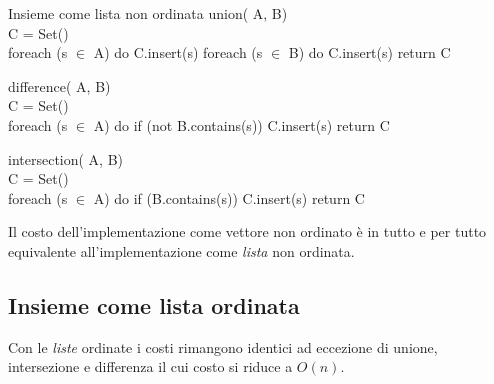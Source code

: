 \begin{minicode}{Insieme come lista non ordinata}
\ind{} union( A,  B)\\
     C = Set()\\
    \indf foreach (s $\in$ A) do\hfill{}
        C.insert(s)\hfill{}
    \indf foreach (s $\in$ B) do\hfill{}
        C.insert(s)\hfill{}
    \indf return C\hfill{}

\ind{} difference( A,  B)\\
     C = Set()\\
    \indf foreach (s $\in$ A) do\hfill{}
        \indff if (not B.contains(s))\hfill{}
            C.insert(s)\hfill{}
    \indf return C\hfill{}
\end{minicode}
\begin{codecont}
\ind{} intersection( A,  B)\\
     C = Set()\\
    \ind foreach (s $\in$ A) do\hfill{}
        \indf if (B.contains(s))\hfill{}
            \indff C.insert(s)\hfill{}
    \indent return C\hfill{}
\end{codecont}

\begin{note}
    Il costo dell'implementazione come vettore non ordinato è in tutto e per
    tutto equivalente all'implementazione come \emph{lista} non ordinata.
\end{note}

\subsection{Insieme come lista ordinata}
Con le \emph{liste} ordinate i costi rimangono identici ad eccezione di
unione, intersezione e differenza il cui costo si riduce a $O(n)$.

